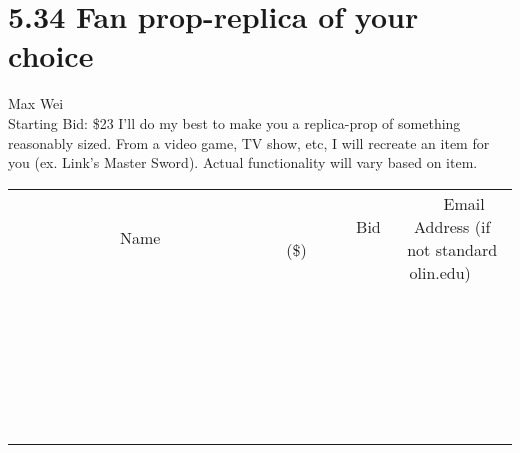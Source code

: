 \documentclass[11pt]{article}
\begin{document}
\section*{5.34 Fan prop-replica of your choice}
Max Wei
\\
Starting Bid: \$23
\newline
I'll do my best to make you a replica-prop of something reasonably sized.  From a video game, TV show, etc, I will recreate an item for you  (ex. Link's Master Sword).  Actual functionality will vary based on item.
\\[6ex]
\begin{tabular}{c c c}
~~~~~~~~~~~~~Name~~~~~~~~~~~~~ & ~~~~~~~~~Bid (\$)~~~~~~~~~  & ~~~Email Address (if not standard olin.edu)~~~\\
 & & \\
\hline
 & & \\
\hline
 & & \\
\hline
 & & \\
\hline
 & & \\
\hline
 & & \\
\hline
 & & \\
\hline
 & & \\
\hline
 & & \\
\hline
 & & \\
\hline
 & & \\
\hline
 & & \\
\hline
 & & \\
\hline
 & & \\
\hline
 & & \\
\hline
 & & \\
\hline
 & & \\
\hline
 & & \\
\hline
 & & \\
\hline
 & & \\
\hline
 & & \\
\hline
 & & \\
\hline
 & & \\
\hline
 & & \\
\hline
 & & \\
\hline
 & & \\
\hline
\end{tabular}
\newpage
\end{document}
